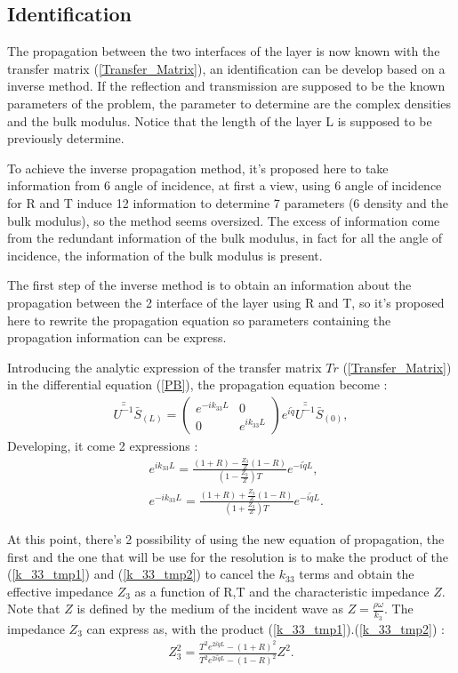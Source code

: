 \documentclass{article}
\begin{document}
\subsection{Identification}
    The propagation between the two interfaces of the layer is now known with the transfer matrix (\ref{Transfer_Matrix}), an identification can be develop based on a inverse method. If the reflection and transmission are supposed to be the known parameters of the problem, the parameter to determine are the complex densities and the bulk modulus. Notice that the length of the layer L is supposed to be previously determine.
    
    To achieve the inverse propagation method, it's proposed here to take information from 6 angle of incidence, at first a view, using 6 angle of incidence for R and T induce 12 information to determine 7 parameters (6 density and the bulk modulus), so the method seems oversized. The excess of information come from the redundant information of the bulk modulus, in fact for all the angle of incidence, the information of the bulk modulus is present. 
    
    The first step of the inverse method is to obtain an information about the propagation between the 2 interface of the layer using R and T, so it's proposed here to rewrite the propagation equation so parameters containing the propagation information can be express. 
    
    Introducing the analytic expression of the transfer matrix $Tr$ (\ref{Transfer_Matrix}) in the differential equation (\ref{PB}), the propagation equation become :
    \begin{align}
    \bar{\bar{U^{-1}}} \bar{S}_{(L)}= \begin{pmatrix}
                                   			e^{-ik_{33}L} & 0 \\ 0 & e^{ik_{33}L}
                                            \end{pmatrix}e^{i\tilde{q}} \bar{\bar{U^{-1}}} \bar{S}_{(0)}, 
   \end{align} 
    Developing, it come 2 expressions  :
    \begin{align}
	&e^{i k_{33}L}=\frac{(1+R)-\frac{Z_3}{Z}(1-R)}{(1-\frac{Z_3}{Z})T}e^{-i\tilde{q}L},\label{k_33_tmp1}\\
    &e^{-i k_{33}L}=\frac{(1+R)+\frac{Z_3}{Z}(1-R)}{(1+\frac{Z_3}{Z})T}e^{-i\tilde{q}L}.\label{k_33_tmp2}
    \end{align} 

    At this point, there's 2 possibility of using the new equation of propagation, the first and the one that will be use for the resolution is to make the product of the (\ref{k_33_tmp1}) and (\ref{k_33_tmp2}) to cancel the $k_{33}$ terms and obtain the effective impedance $Z_3$ as a function of R,T and the characteristic impedance $Z$. Note that $Z$ is defined by the medium of the incident wave as $Z=\frac{\rho \omega}{k_3}$.
    The impedance $Z_3$ can express as, with the product (\ref{k_33_tmp1}).(\ref{k_33_tmp2}) :
    \begin{align}
    Z_3^2=\frac{T^2e^{2i\tilde{q}L}-(1+R)^2}{T^2e^{2i\tilde{q}L}-(1-R)^2}Z^2\label{Z3}.
    \end{align}
    
\end{document}
